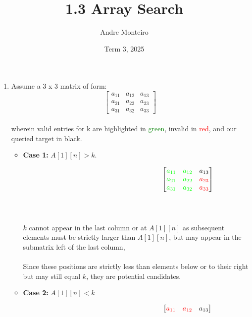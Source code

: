 \documentclass[12pt]{article}
\title{1.3 Array Search}
\author{Andre Monteiro}
\date{Term 3, 2025}
\begin{document}
\maketitle
\newpage
\begin{enumerate}
    \item Assume a 3 x 3 matrix of form: 
    \[
    \begin{bmatrix}
    a_{11} & a_{12} & a_{13} \\
    a_{21} & a_{22} & a_{23} \\
    a_{31} & a_{32} & a_{33} 
    \end{bmatrix}
    \] 
    \\ wherein valid entries for k are highlighted in \textcolor{green}{green}, invalid in \textcolor{red}{red}, and our queried target in black.
    \begin{itemize}
        \item \textbf{Case 1:} $A[1][n] > k$. \\
        \begin{varwidth}{\textwidth}
        \[ \hspace{15em}
        \begin{bmatrix}
        \textcolor{green}{a_{11}} & \textcolor{green}{a_{12}} & a_{13} \\
        \textcolor{green}{a_{21}} & \textcolor{green}{a_{22}} & \textcolor{red}{a_{23}} \\
        \textcolor{green}{a_{31}} & \textcolor{green}{a_{32}} & \textcolor{red}{a_{33}}
        \end{bmatrix}
        \] \\
        \end{varwidth}
        \\ 
        $k$ cannot appear in the last column or at $A[1][n]$ as subsequent elements must be strictly larger than $A[1][n]$, but may appear in the submatrix left of the last column, 
        \\\\ Since these positions are strictly less than elements below or to their right but may still equal $k$, they are potential candidates.
        \item \textbf{Case 2:} $A[1][n] < k$ \\
        \begin{varwidth}{\textwidth}
        \[ \hspace{15em}
        \begin{bmatrix}
        \textcolor{red}{a_{11}} & \textcolor{red}{a_{12}} & a_{13} \\

\end{bmatrix}\]
\end{varwidth}
\end{itemize}
\end{enumerate}
\end{document}
